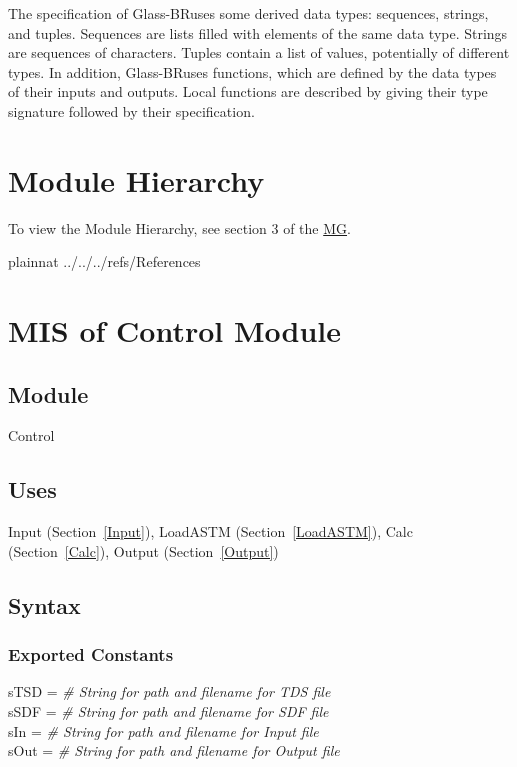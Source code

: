 \documentclass[12pt, titlepage]{article}
\newcommand{\progname}[1]{Glass-BR}
\begin{document}
\noindent
The specification of \progname \ uses some derived data types: sequences, strings, and
tuples. Sequences are lists filled with elements of the same data type. Strings
are sequences of characters. Tuples contain a list of values, potentially of
different types. In addition, \progname \ uses functions, which
are defined by the data types of their inputs and outputs. Local functions are
described by giving their type signature followed by their specification.

\section{Module Hierarchy} 

To view the Module Hierarchy, see section 3 of the \href{../MG/glassbr_mg.pdf}{MG}.

 {plainnat}
 {../../../refs/References}

\newpage


\section{MIS of Control Module} \label{Main}

\subsection{Module}

Control

\subsection{Uses}

Input (Section~\ref{Input}), LoadASTM (Section~\ref{LoadASTM}), Calc
(Section~\ref{Calc}), Output (Section~\ref{Output})

\subsection{Syntax}

\subsubsection {Exported Constants}

sTSD = \textit{\# String for path and filename for TDS file}\\
sSDF = \textit{\# String for path and filename for SDF file}\\
sIn = \textit{\# String for path and filename for Input file}\\
sOut = \textit{\# String for path and filename for Output file}
\end{document}
